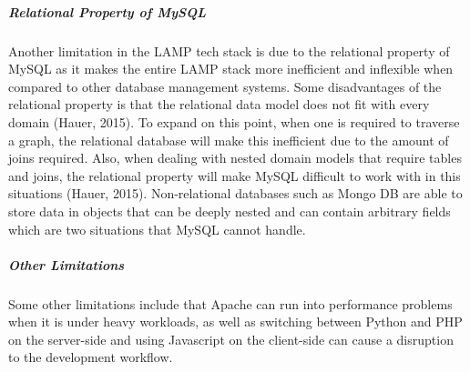 \documentclass[a4paper, 11pt]{report}
\begin{document}
	\subparagraph{Relational Property of MySQL}
	\noindent
	Another limitation in the LAMP tech stack is due to the relational property of MySQL as it makes the entire LAMP stack more inefficient and inflexible when compared to other database management systems. Some disadvantages of the relational property is that the relational data model does not fit with every domain (Hauer, 2015). To expand on this point, when one is required to traverse a graph, the relational database will make this inefficient due to the amount of joins required. Also, when dealing with nested domain models that require tables and joins, the relational property will make MySQL difficult to work with in this situations (Hauer, 2015). Non-relational databases such as Mongo DB are able to store data in objects that can be deeply nested and can contain arbitrary fields which are two situations that MySQL cannot handle. 
	
	\subparagraph{Other Limitations}
	\noindent
	Some other limitations include that Apache can run into performance problems when it is under heavy workloads, as well as switching between Python and PHP on the server-side and using Javascript on the client-side can cause a disruption to the development workflow. 
	
\end{document}
